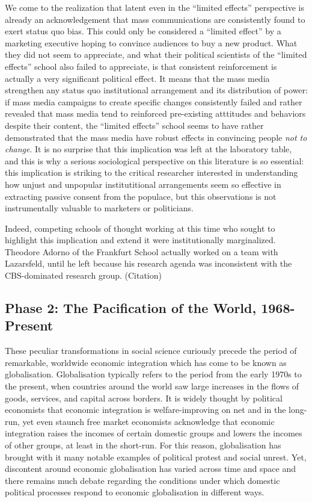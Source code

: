 \documentclass[12pt,book]{article}
\begin{document}
We come to the realization that latent even in the ``limited effects''
perspective is already an acknowledgement that mass communications are
consistently found to exert status quo bias. This could only be
considered a ``limited effect'' by a marketing executive hoping to
convince audiences to buy a new product. What they did not seem to
appreciate, and what their political scientists of the ``limited
effects'' school also failed to appreciate, is that consistent
reinforcement is actually a very significant political effect. It means
that the mass media strengthen any status quo institutional arrangement
and its distribution of power: if mass media campaigns to create
specific changes consistently failed and rather revealed that mass media
tend to reinforced pre-existing atttitudes and behaviors despite their
content, the ``limited effects'' school seems to have rather
demonstrated that the mass media have robust effects in convincing
people \emph{not to change}. It is no surprise that this implication was
left at the laboratory table, and this is why a serious sociological
perspective on this literature is so essential: this implication is
striking to the critical researcher interested in understanding how
unjust and unpopular institutitional arrangements seem so effective in
extracting passive consent from the populace, but this observations is
not instrumentally valuable to marketers or politicians.

Indeed, competing schools of thought working at this time who sought to
highlight this implication and extend it were institutionally
marginalized. Theodore Adorno of the Frankfurt School actually worked on
a team with Lazarsfeld, until he left because his research agenda was
inconsistent with the CBS-dominated research group. (Citation)

\subsection{Phase 2: The Pacification of the World,
1968-Present}\label{phase-2-the-pacification-of-the-world-1968-present}

These peculiar transformations in social science curiously precede the
period of remarkable, worldwide economic integration which has come to
be known as globalisation. Globalisation typically refers to the period
from the early 1970s to the present, when countries around the world saw
large increases in the flows of goods, services, and capital across
borders. It is widely thought by political economists that economic
integration is welfare-improving on net and in the long-run, yet even
staunch free market economists acknowledge that economic integration
raises the incomes of certain domestic groups and lowers the incomes of
other groups, at least in the short-run. For this reason, globalisation
has brought with it many notable examples of political protest and
social unrest. Yet, discontent around economic globalisation has varied
across time and space and there remains much debate regarding the
conditions under which domestic political processes respond to economic
globalisation in different ways.
\end{document}
